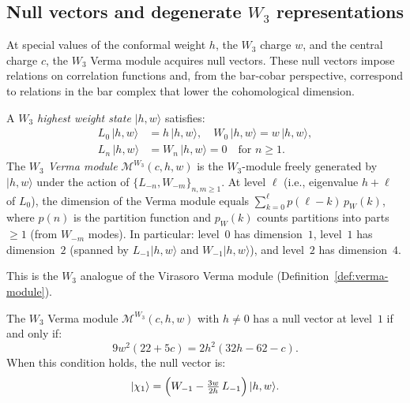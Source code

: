 \subsection{\texorpdfstring{Null vectors and degenerate $W_3$ representations}{Null vectors and degenerate W3 representations}}
\label{sec:w3-null-vectors}

At special values of the conformal weight $h$, the $W_3$
charge $w$, and the central charge $c$, the $W_3$ Verma module
acquires null vectors.  These null vectors impose relations on
correlation functions and, from the bar-cobar perspective,
correspond to relations in the bar complex that lower the
cohomological dimension.

\begin{definition}
\label{def:w3-hw-state}
A \emph{$W_3$ highest weight state} $|h,w\rangle$ satisfies:
\begin{align}
L_0\,|h,w\rangle &= h\,|h,w\rangle, \quad
  W_0\,|h,w\rangle = w\,|h,w\rangle, \\
L_n\,|h,w\rangle &= W_n\,|h,w\rangle = 0
  \quad \text{for } n \geq 1.
\end{align}
The \emph{$W_3$ Verma module} $\mathcal{M}^{W_3}(c,h,w)$ is
the $W_3$-module freely generated by $|h,w\rangle$ under the
action of $\{L_{-n}, W_{-m}\}_{n,m \geq 1}$.  At level $\ell$
(i.e., eigenvalue $h + \ell$ of $L_0$), the dimension of the
Verma module equals $\sum_{k=0}^{\ell} p(\ell - k)\, p_W(k)$,
where $p(n)$ is the partition function and $p_W(k)$ counts
partitions into parts $\geq 1$ (from $W_{-m}$ modes).  In
particular: level~$0$ has dimension~$1$, level~$1$ has
dimension~$2$ (spanned by $L_{-1}|h,w\rangle$ and
$W_{-1}|h,w\rangle$), and level~$2$ has dimension~$4$.

This is the $W_3$ analogue of the Virasoro Verma module
(Definition~\ref{def:verma-module}).
\end{definition}

\begin{theorem}
\label{thm:w3-null-level1}
The $W_3$ Verma module $\mathcal{M}^{W_3}(c,h,w)$ with $h \neq 0$
has a null vector at level~$1$ if and only if:
\begin{equation}\label{eq:w3-null-curve}
9w^2(22 + 5c) = 2h^2(32h - 62 - c).
\end{equation}
When this condition holds, the null vector is:
\begin{equation}\label{eq:w3-null-vec}
|\chi_1\rangle = \Bigl(W_{-1} - \tfrac{3w}{2h}\, L_{-1}\Bigr)\,|h,w\rangle.
\end{equation}
\end{theorem}

